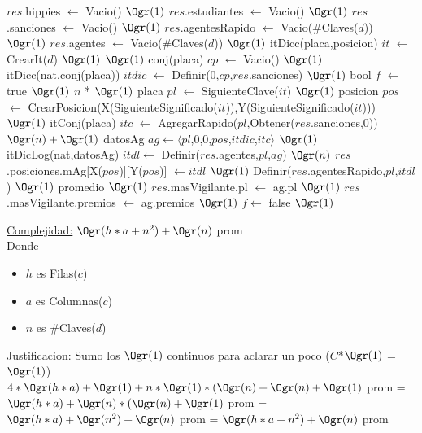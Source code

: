 \begin{Algoritmos}
\begin{algorithm}[H]
\begin{algorithmic}[1]
	\State $res$.hippies $\gets$ Vacio() \Comment $\Ogr(1)$
	\State $res$.estudiantes $\gets$ Vacio() \Comment $\Ogr(1)$
	\State $res$.sanciones $\gets$ Vacio() \Comment $\Ogr(1)$
	\State $res$.agentesRapido $\gets$ Vacio($\#$Claves($d$)) \Comment $\Ogr(1)$
	\State $res$.agentes $\gets$ Vacio($\#$Claves($d$)) \Comment $\Ogr(1)$ %
	\State itDicc(placa,posicion) $it$ $\gets$ CrearIt($d$) \Comment $\Ogr(1)$
	 \Comment $\Ogr(1)$
		\State conj(placa) $cp$ $\gets$ Vacio() \Comment $\Ogr(1)$
		\State itDicc(nat,conj(placa)) $itdic$ $\gets$ Definir(0,$cp$,$res$.sanciones) \Comment $\Ogr(1)$
		\State bool $f$ $\gets$ true \Comment $\Ogr(1)$
		 \Comment $n$ * $\Ogr(1)$
	 	\State placa $pl$ $\gets$ SiguienteClave($it$) \Comment $\Ogr(1)$
	 	\State posicion $pos$ $\gets$ CrearPosicion(X(SiguienteSignificado($it$)),Y(SiguienteSignificado($it$))) \Comment $\Ogr(1)$
	 	\State itConj(placa) $itc$ $\gets$ AgregarRapido($pl$,Obtener($res$.sanciones,0)) \Comment $\Ogr(n) + \Ogr(1)$
	 	\State datosAg $ag \gets \langle pl$,0,0,$pos$,$itdic$,$itc \rangle$ \Comment $\Ogr(1)$
	 	\State itDicLog(nat,datosAg) $itdl \gets$ Definir($res$.agentes,$pl$,$ag$) \Comment $\Ogr(n)$ %
	 	\State $res$.posiciones.mAg[X($pos$)][Y($pos$)] $\gets itdl$ \Comment $\Ogr(1)$
	 	\State Definir($res$.agentesRapido,$pl$,$itdl$) \Comment $\Ogr(1)$ promedio
	 	 \Comment $\Ogr(1)$
	 		\State $res$.masVigilante.pl $\gets$ ag.pl \Comment $\Ogr(1)$
	 		\State $res$.masVigilante.premios $\gets$ ag.premios \Comment $\Ogr(1)$
	 		\State $f \gets$ false \Comment $\Ogr(1)$
	 	\EndIf
	 \EndWhile
	 \EndIf
\EndProcedure
\end{algorithmic}

\underline{Complejidad:} $\Ogr(h*a + n^2) + \Ogr(n)$ prom\\
Donde 
\begin{itemize}
	\item $h$ es Filas($c$)
	\item $a$ es Columnas($c$)
	\item $n$ es $\#$Claves($d$)
\end{itemize}	
\underline{Justificacion:} Sumo los $\Ogr(1)$ continuos para aclarar un poco ($C$*$\Ogr(1)$ = $\Ogr(1)$)\\
$4*\Ogr(h*a) + \Ogr(1) + n * \Ogr(1) * (\Ogr(n) + \Ogr(n) + \Ogr(1)$ prom = $\Ogr(h*a) + \Ogr(n)*(\Ogr(n) + \Ogr(1)$ prom = $\Ogr(h*a) + \Ogr(n^2) + \Ogr(n)$ prom = $\Ogr(h*a + n^2) + \Ogr(n)$ prom
\end{algorithm}



\end{Algoritmos}
